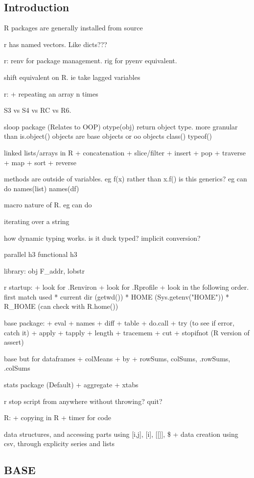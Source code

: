 
\subsection{Introduction}

R packages are generally installed from source

r has named vectors. Like dicts???

r: renv for package management. rig for pyenv equivalent.

shift equivalent on R. ie take lagged variables

r:
+ repeating an array n times


S3 vs S4 vs RC vs R6.

sloop package (Relates to OOP)
otype(obj) return object type. more granular than is.object()
objects are base objects or oo objects
class()
typeof()

linked lists/arrays in R
+ concatenation
+ slice/filter
+ insert
+ pop
+ traverse
+ map
+ sort
+ reverse

methods are outside of variables. eg f(x) rather than x.f()
is this generics?
eg can do names(list) names(df)

macro nature of R. eg can do %

iterating over a string

how dynamic typing works. is it duck typed? implicit conversion?

parallel h3
functional h3

library: obj F\_addr, lobstr

r startup:
+ look for .Renviron
+ look for .Rprofile
+ look in the following order. first match used
  * current dir (getwd())
  * HOME (Sys.getenv("HOME"))
  * R\_HOME (can check with R.home())

base package:
+ eval
+ names
+ diff
+ table
+ do.call
+ try (to see if error, catch it)
+ apply
+ tapply
+ length
+ tracemem
+ cut
+ stopifnot (R version of assert)

base but for dataframes
+ colMeans
+ by
+ rowSums, colSums, .rowSums, .colSums


stats package (Default)
+ aggregate
+ xtabs

r stop script from anywhere without throwing? quit?

R:
+ copying in R
+ timer for code

data structures, and accessing parts using [i,j], [i], [[]], \$
+ data creation using csv, through explicity series and lists

\subsection{BASE}
